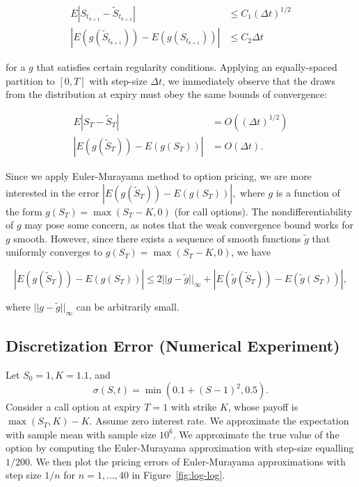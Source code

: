 \documentclass[12pt]{article}
\numberwithin{equation}{section}
\newcommand{\abs}[1]{\left|#1\right|}
\newcommand{\norm}[1]{||#1||}
\newcommand{\pr}[1]{\left(#1\right)}
\begin{document}
\begin{align}
E\abs{S_{t_{k+1}} - \tilde S_{t_{k+1}}} &\le C_1(\Delta t)^{1/2}
\tag{Strong convergence} \\ 
\abs{E(g(\tilde S_{t_{k+1}})) - E (g(S_{t_{k+1}}))} &\le C_2
\Delta t \tag{Weak convergence}
\end{align}

for a $g$ that satisfies certain regularity conditions. 
Applying an equally-spaced partition to $[0,T]$ with step-size $\Delta t$, we
immediately observe that the draws from the distribution at expiry must obey the
same bounds of convergence:

\begin{align*}
E\abs{S_{T} - \tilde S_{T}} &= O\pr{(\Delta t)^{1/2}} \\
\abs{E(g(\tilde S_{{T}})) - E (g(S_{T}))} &= O(\Delta t).
\end{align*}

Since we apply Euler-Murayama method to option pricing, we are more interested
in the error $\abs{E(g(\tilde S_T)) - E(g(S_T))},$ where $g$ is a function of
the form $g(S_T) = \max(S_T - K, 0)$ (for call options). The
nondifferentiability of $g$ may pose some concern, as
\cite{higham2001algorithmic} notes that the weak convergence bound works for $g$
smooth. However, since there exists a sequence of smooth functions $\tilde g$
that uniformly converges to $g(S_T) = \max(S_T - K, 0)$, we have 

\[
\abs{E(g(\tilde S_T)) - E(g(S_T))} \le 2\norm{g-\tilde g}_\infty + \abs{E(\tilde
g(\tilde S_{{T}})) - E (\tilde g(S_{T}))},
\]

where $\norm{g-\tilde g}_\infty$ can be arbitrarily small. 

\subsection{Discretization Error (Numerical Experiment)}

Let $S_0 = 1, K = 1.1$, and \[\sigma(S, t) = \min\pr{0.1 + (S - 1)^2, 0.5}.\]
Consider a call option at expiry $T = 1$ with strike $K$, whose payoff is
$\max(S_T, K) - K$. Assume zero interest rate. We approximate the expectation
with sample mean with sample size $10^6$. We approximate the true value of the
option by computing the Euler-Murayama approximation with step-size equalling
$1/200$. We then plot the pricing errors of Euler-Murayama approximations with
step size $1/n$ for $n=1,\ldots,40$ in Figure~\ref{fig:log-log}. 
\end{document}
